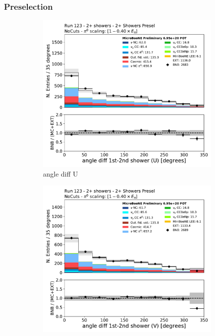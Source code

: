 \subsubsection{\zpsel Preselection}
\begin{figure}[H]
    \centering
    \begin{subfigure}{0.3\textwidth}
    \includegraphics[width=1.0\textwidth]{Sidebands/Figures/TwoShr_1e0pSel/Presel/anglediff_U.pdf}
    \caption{angle diff U}
    \end{subfigure}
    \begin{subfigure}{0.3\textwidth}
    \includegraphics[width=1.0\textwidth]{Sidebands/Figures/TwoShr_1e0pSel/Presel/anglediff_V.pdf}

\end{subfigure}
\end{figure}
